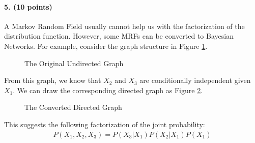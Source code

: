 \documentclass[11pt]{article}
\begin{document}
\paragraph{5. (10 points)} A Markov Random Field usually cannot help us with the factorization of the distribution function. However, some MRFs can be converted to Bayesian Networks. For example, consider the graph structure in Figure \ref{fig:utm1}.
\begin{figure}[h]
	\begin{center}
		\caption{The Original Undirected Graph}
			\label{fig:utm1}
		\end{center}
\end{figure}
From this graph, we know that $X_2$ and $X_3$ are conditionally independent given $X_1$. We can draw the corresponding directed graph as Figure \ref{fig:dtm2}.
\begin{figure}[h]
	\begin{center}
		\caption{The Converted Directed Graph}
			\label{fig:dtm2}
		\end{center}
\end{figure}
This suggests the following factorization of the joint probability:
\begin{eqnarray}
P(X_1, X_2, X_3) = P(X_3 | X_1) P(X_2 | X_1) P(X_1) \nonumber
\end{eqnarray}
\end{document}
